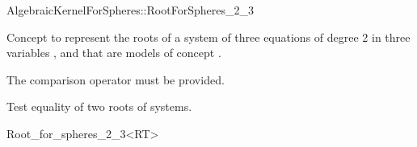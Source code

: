 \begin{ccRefConcept}{AlgebraicKernelForSpheres::RootForSpheres_2_3}

\ccDefinition

Concept to represent the roots of a system of three equations of degree 2
in three variables ,  and  that are models of concept
.



\ccOperations

The comparison operator \ccc{==} must be provided. 

{Test equality of two roots of systems.}

\ccHasModels


\ccSeeAlso


\end{ccRefConcept}

\begin{ccRefClass}{Root_for_spheres_2_3<RT>}


\ccIsModel


\end{ccRefClass}

